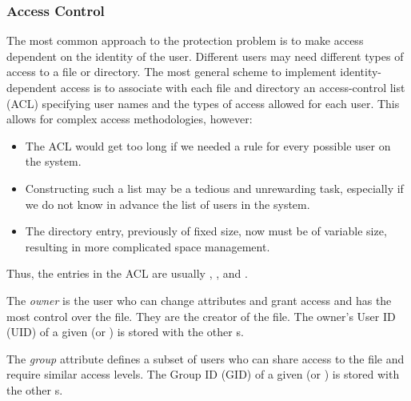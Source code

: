 \subsubsection{Access Control}\label{subsubsec:Access_Control}
The most common approach to the protection problem is to make access dependent on the identity of the user.
Different users may need different types of access to a file or directory.
The most general scheme to implement identity-dependent access is to associate with each file and directory an access-control list (ACL) specifying user names and the types of access allowed for each user.
This allows for complex access methodologies, however:
\begin{itemize}[noitemsep]
\item The ACL would get too long if we needed a rule for every possible user on the system.
\item Constructing such a list may be a tedious and unrewarding task, especially if we do not know in advance the list of users in the system.
\item The directory entry, previously of fixed size, now must be of variable size, resulting in more complicated space management.
\end{itemize}

Thus, the entries in the ACL are usually , , and .
\begin{definition}[Owner]\label{def:File_Owner}
  The \emph{owner} is the user who can change attributes and grant access and has the most control over the file.
  They are the creator of the file.
  The owner's User ID (UID) of a given  (or ) is stored with the other s.
\end{definition}

\begin{definition}[Group]\label{def:File_Group}
  The \emph{group} attribute defines a subset of users who can share access to the file and require similar access levels.
  The Group ID (GID) of a given  (or ) is stored with the other s.
\end{definition}


